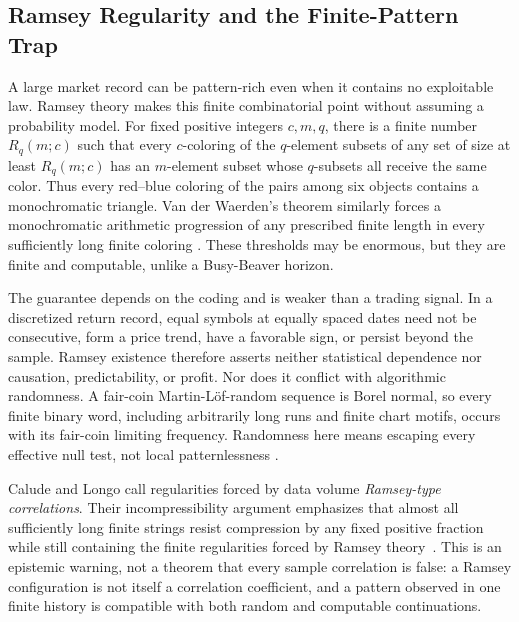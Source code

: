 \documentclass[aps,pra,reprint,superscriptaddress,amsmath,amssymb,floatfix]{revtex4-2}
\theoremstyle{plain}
\theoremstyle{definition}
\theoremstyle{remark}
\begin{document}
\subsection{Ramsey Regularity and the Finite-Pattern Trap}
\label{sec:ramseytrap}

A large market record can be pattern-rich even when it contains no exploitable
law. Ramsey theory makes this finite combinatorial point without assuming a
probability model. For fixed positive integers \(c,m,q\), there is a finite
number \(R_q(m;c)\) such that every \(c\)-coloring of the \(q\)-element subsets
of any set of size at least \(R_q(m;c)\) has an \(m\)-element subset whose
\(q\)-subsets all receive the same color. Thus every red--blue coloring of the
pairs among six objects contains a monochromatic triangle. Van der Waerden's
theorem similarly forces a monochromatic arithmetic progression of any
prescribed finite length in every sufficiently long finite coloring
\cite{Ramsey-GRS-90,GS-90}. These thresholds may be enormous, but they are
finite and computable, unlike a Busy-Beaver horizon.

The guarantee depends on the coding and is weaker than a trading signal. In a
discretized return record, equal symbols at equally spaced dates need not be
consecutive, form a price trend, have a favorable sign, or persist beyond the
sample. Ramsey existence therefore asserts neither statistical dependence nor
causation, predictability, or profit. Nor does it conflict with algorithmic
randomness. A fair-coin Martin-L\"of-random sequence is Borel normal, so every
finite binary word, including arbitrarily long runs and finite chart motifs,
occurs with its fair-coin limiting frequency. Randomness here means escaping
every effective null test, not local patternlessness
\cite{calude:02,Nies2009}.

Calude and Longo call regularities forced by data volume \emph{Ramsey-type
correlations}. Their incompressibility argument emphasizes that almost all
sufficiently long finite strings resist compression by any fixed positive
fraction while still containing the finite regularities forced by Ramsey
theory~\cite{Calude2016}. This is an epistemic warning, not a theorem that every
sample correlation is false: a Ramsey configuration is not itself a
correlation coefficient, and a pattern observed in one finite history is
compatible with both random and computable continuations.
\end{document}
